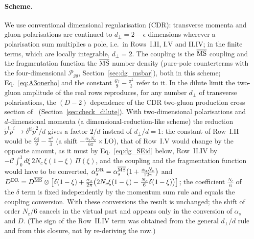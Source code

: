 \paragraph{Scheme.} We use conventional dimensional regularisation (CDR): transverse momenta and gluon polarisations are continued to $d_\perp=2-\epsilon$ dimensions wherever a polarisation sum multiplies a pole, i.e.\ in Rows~I.II, I.V and II.IV; in the finite terms, which are locally integrable, $d_\perp=2$. The coupling is the $\overline{\rm MS}$ coupling and the fragmentation function the $\overline{\rm MS}$ number density (pure-pole counterterms with the four-dimensional $\mathcal P_{gg}$, Section~\ref{sec:dg_msbar}), both in this scheme; Eq.~\eqref{eq:A3onerho} and the constant $\frac{67}{9}-\frac{\pi^2}{3}$ refer to it. In the dilute limit the two-gluon amplitude of the real rows reproduces, for any number $d_\perp$ of transverse polarisations, the $(D-2)$ dependence of the CDR two-gluon production cross section of~\cite{Fadin:1998py,Bartels:2006hg} (Section~\ref{sec:check_dilute}). With two-dimensional polarisations and $d$-dimensional momenta (a dimensional-reduction-like scheme) the reduction $\tilde p^l\tilde p^i\to\delta^{li}\tilde p^2/d$ gives a factor $2/d$ instead of $d_\perp/d=1$: the constant of Row~I.II would be $\frac{64}{9}-\frac{\pi^2}{3}$ (a shift $-\frac{\alpha_sN_c}{6\pi}\times$LO), that of Row~I.V would change by the opposite amount, as it must by Eq.~\eqref{eq:dg_SEid} below, Row~II.IV by $-\mathcal C\int_0^1d\xi\,2N_c\,\xi(1-\xi)\,\Pi(\xi)$, and the coupling and the fragmentation function would have to be converted, $\alpha_s^{\rm DR}=\alpha_s^{\overline{\rm MS}}\big(1+\frac{\alpha_sN_c}{12\pi}\big)$ and $D^{\rm DR}=D^{\overline{\rm MS}}\otimes\big[\delta(1-\xi)+\frac{\alpha_s}{2\pi}\big(2N_c\xi(1-\xi)-\frac{N_c}{6}\delta(1-\xi)\big)\big]$; the coefficient $\frac{N_c}{6}$ of the $\delta$ term is fixed independently by the momentum sum rule and equals the coupling conversion. With these conversions the result is unchanged; the shift of order $N_c/6$ cancels in the virtual part and appears only in the conversion of $\alpha_s$ and $D$. (The sign of the Row~II.IV term was obtained from the general $d_\perp/d$ rule and from this closure, not by re-deriving the row.)

